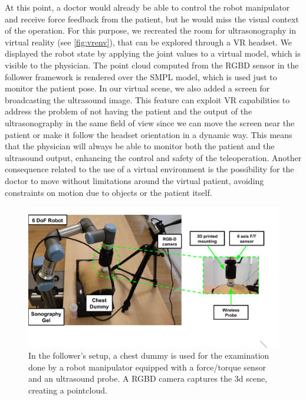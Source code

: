 At this point, a doctor would already be able to control the robot manipulator and receive force feedback from the patient, but he would miss the visual context of the operation. For this purpose, we recreated the room for ultrasonography in virtual reality (see  \autoref{fig:vrenv}), that can be explored through a VR headset.
We displayed the robot state by applying the joint values to a virtual model, which is visible to the physician. The point cloud computed from the RGBD sensor in the follower framework is rendered over the SMPL model, which is used just to monitor the patient pose. In our virtual scene, we also added a screen for broadcasting the ultrasound image. This feature can exploit VR capabilities to address the problem of not having the patient and the output of the ultrasonography in the same field of view since we can move the screen near the patient or make it follow the headset orientation in a dynamic way. This means that the physician will always be able to monitor both the patient and the ultrasound output, enhancing the control and safety of the teleoperation.
Another consequence related to the use of a virtual environment is the possibility for the doctor to move without limitations around the virtual patient, avoiding constraints on motion due to objects or the patient itself.

\begin{figure}[t]
    \centering
    \includegraphics[clip,trim=0 50 0 20, width=1\columnwidth]{images/framework/setup.pdf}
    \caption{In the follower's setup, a chest dummy is used for the examination done by a robot manipulator equipped with a force/torque sensor and an ultrasound probe. A RGBD camera captures the 3d scene, creating a pointcloud.}
    \label{fig:realenv}
\end{figure}


